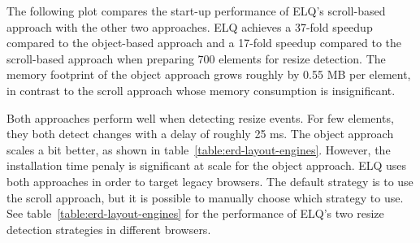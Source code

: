 \documentclass[sigconf,9pt]{acmart}
\newcommand{\elq}{ELQ}
\begin{document}
    The following plot compares the start-up performance
    of \elq{}'s scroll-based approach with the other two approaches.
    \elq{} achieves a 37-fold speedup compared to the object-based
    approach and a 17-fold speedup compared to the scroll-based
    approach when preparing 700 elements for resize detection.
    The memory footprint of the object approach grows roughly by 0.55 MB per element, in contrast to the scroll approach whose memory consumption is insignificant.

    Both approaches perform well when detecting resize events. For few elements, they both detect changes with a delay of roughly 25 ms.
    The object approach scales a bit better, as shown in table~\ref{table:erd-layout-engines}. However, the installation time penaly is significant at scale for the object approach.
    \elq{} uses both approaches in order to target legacy browsers. The default strategy is to use the scroll approach, but it is possible to manually choose which strategy to use.
    See table~\ref{table:erd-layout-engines} for the performance of \elq{}'s two resize detection strategies in different browsers.
\end{document}
